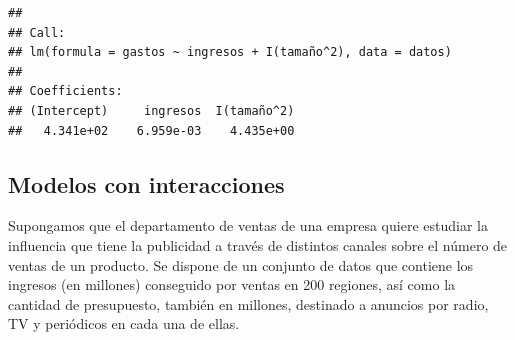 \documentclass[]{book}
\begin{document}
\begin{verbatim}
## 
## Call:
## lm(formula = gastos ~ ingresos + I(tamaño^2), data = datos)
## 
## Coefficients:
## (Intercept)     ingresos  I(tamaño^2)  
##   4.341e+02    6.959e-03    4.435e+00
\end{verbatim}

\subsection{Modelos con interacciones}\label{modelos-con-interacciones}

Supongamos que el departamento de ventas de una empresa quiere estudiar
la influencia que tiene la publicidad a través de distintos canales
sobre el número de ventas de un producto. Se dispone de un conjunto de
datos que contiene los ingresos (en millones) conseguido por ventas en
200 regiones, así como la cantidad de presupuesto, también en millones,
destinado a anuncios por radio, TV y periódicos en cada una de ellas.
\end{document}
